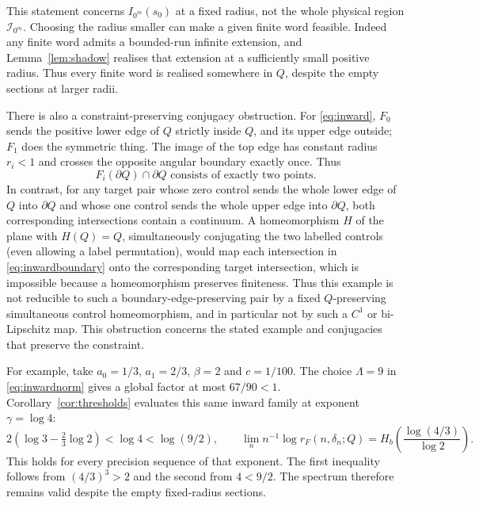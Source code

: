 \documentclass[11pt]{amsart}
\theoremstyle{definition}
\theoremstyle{remark}
\numberwithin{equation}{section}
\begin{document}
This statement concerns \(I_{0^m}(s_0)\) at a fixed radius, not the
whole physical region \(\mathcal I_{0^m}\). Choosing the radius smaller
can make a given finite word feasible. Indeed any finite word admits
a bounded-run infinite extension, and Lemma~\ref{lem:shadow} realises that
extension at a sufficiently small positive radius. Thus every finite
word is realised somewhere in $Q$, despite the empty sections at
larger radii.

There is also a constraint-preserving conjugacy obstruction.
For \eqref{eq:inward}, \(F_0\) sends the positive lower edge of $Q$ strictly
inside $Q$, and its upper edge outside; \(F_1\) does the symmetric
thing. The image of the top edge has constant radius \(r_i<1\)
and crosses the opposite angular boundary exactly once. Thus
\begin{equation}
F_i(\partial Q)\cap\partial Q
                  \text{ consists of exactly two points}.  \label{eq:inwardboundary}
\end{equation}
In contrast, for any target pair whose zero control sends the whole
lower edge of $Q$ into $\partial Q$ and whose one control sends the
whole upper edge into $\partial Q$, both corresponding intersections
contain a continuum. A homeomorphism \(H\) of the plane with
\(H(Q)=Q\), simultaneously conjugating the two labelled controls
(even allowing a label permutation), would map each intersection
in \eqref{eq:inwardboundary} onto the corresponding target intersection,
which is impossible because a homeomorphism preserves finiteness.
Thus this example is not reducible to
such a boundary-edge-preserving pair by a fixed $Q$-preserving simultaneous
control homeomorphism, and in particular not by such a \(C^1\)
or bi-Lipschitz map. This obstruction concerns the stated example
and conjugacies that preserve the constraint.

For example, take $a_0=1/3$, $a_1=2/3$, $\beta=2$ and $c=1/100$.
The choice $\Lambda=9$ in \eqref{eq:inwardnorm} gives a global
factor at most $67/90<1$. Corollary~\ref{cor:thresholds} evaluates
this same inward family at exponent $\gamma=\log4$:
\[
2\left(\log3-\tfrac23\log2\right)<\log4<\log(9/2),\qquad
\lim_n n^{-1}\log r_F(n,\delta_n;Q)
 =H_b\!\left(\frac{\log(4/3)}{\log2}\right).
\]
This holds for every precision sequence of that exponent.
The first inequality follows from $(4/3)^3>2$ and the second
from $4<9/2$. The spectrum therefore remains valid despite the
empty fixed-radius sections.
\end{document}
